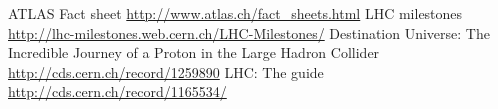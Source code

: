\documentclass{atlasnote}
\begin{document}
\begin{thebibliography}{1}
     ATLAS Fact sheet \url{http://www.atlas.ch/fact_sheets.html}
     LHC milestones \url{http://lhc-milestones.web.cern.ch/LHC-Milestones/}
     Destination Universe: The Incredible Journey of a Proton in the Large Hadron Collider \url{http://cds.cern.ch/record/1259890}
     LHC: The guide \url{http://cds.cern.ch/record/1165534/}
\end{thebibliography}
\end{document}
